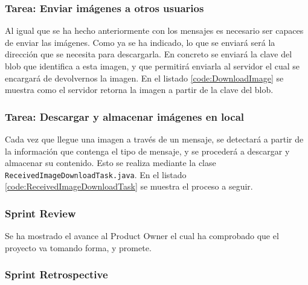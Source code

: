 


\subsubsection{Tarea: Enviar imágenes a otros usuarios}

Al igual que se ha hecho anteriormente con los mensajes es necesario ser capaces de enviar las imágenes. Como ya se ha indicado, lo que se enviará será la dirección que se necesita para descargarla. En concreto se enviará la clave del blob que identifica a esta imagen, y que permitirá enviarla al servidor el cual se encargará de devolvernos la imagen. En el listado \ref{code:DownloadImage} se muestra como el servidor retorna la imagen a partir de la clave del blob.



\subsubsection{Tarea: Descargar y almacenar imágenes en local}

Cada vez que llegue una imagen a través de un mensaje, se detectará a partir de la información que contenga el tipo de mensaje, y se procederá a descargar y almacenar su contenido. Esto se realiza mediante la clase \texttt{ReceivedImageDownloadTask.java}. En el listado \ref{code:ReceivedImageDownloadTask} se muestra el proceso a seguir.



\subsubsection{Sprint Review}

Se ha mostrado el avance al Product Owner el cual ha comprobado que el proyecto va tomando forma, y promete.

\subsubsection{Sprint Retrospective}

